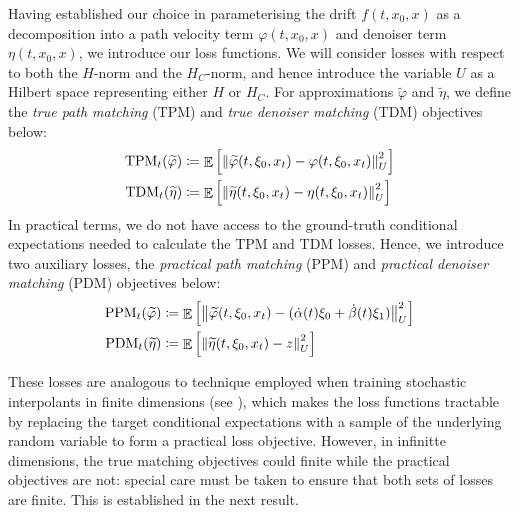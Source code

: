 Having established our choice in parameterising the drift \(f(t, x_{0}, x)\) as a decomposition into a path velocity term \(\varphi(t, x_{0}, x)\) and denoiser term \(\eta(t, x_{0}, x)\), we introduce our loss functions. We will consider losses with respect to both the \(H\)-norm and the \(H_{C}\)-norm, and hence introduce the variable \(U\) as a Hilbert space representing either \(H\) or \(H_{C}\). For approximations \(\widetilde{\varphi}\) and \(\widetilde{\eta}\), we define the \textit{true path matching} (TPM) and \textit{true denoiser matching} (TDM) objectives below:
\begin{align}
  \mathrm{TPM}_{t}(\widetilde{\varphi}) &\coloneqq \mathop{\mathbb{E}}\qty[\norm{ \widetilde{\varphi}(t, \xi_{0}, x_{t}) - \varphi(t, \xi_{0}, x_{t})}^{2}_{U}]\label{eqn:tpm} \\
  \mathrm{TDM}_{t}(\widetilde{\eta}) &\coloneqq \mathop{\mathbb{E}}\qty[\norm{ \widetilde{\eta}(t, \xi_{0}, x_{t}) - \eta(t, \xi_{0}, x_{t})}^{2}_{U}] \label{eqn:tdm}
\end{align}
In practical terms, we do not have access to the ground-truth conditional expectations needed to calculate the TPM and TDM losses. Hence, we introduce two auxiliary losses, the \textit{practical path matching} (PPM) and \textit{practical denoiser matching} (PDM) objectives below:
\begin{align}
  \mathrm{PPM}_{t}(\widetilde{\varphi}) &\coloneqq \mathop{\mathbb{E}}\qty[\norm{ \widetilde{\varphi}(t, \xi_{0}, x_{t}) - (\dot{\alpha}(t) \xi_{0} + \dot{\beta}(t) \xi_{1})}^{2}_{U}] \label{eqn:ppm}\\
  \mathrm{PDM}_{t}(\widetilde{\eta}) &\coloneqq \mathop{\mathbb{E}}\qty[\norm{ \widetilde{\eta}(t, \xi_{0}, x_{t}) - z}^{2}_{U}] \label{eqn:pdm}
\end{align}

These losses are analogous to technique employed when training stochastic interpolants in finite dimensions (see \citealp[][Theorems 2.7--2.8]{albergo2023stochasticinterpolantsunifyingframework}), which makes the loss functions tractable by replacing the target conditional expectations with a sample of the underlying random variable to form a practical loss objective. However, in infinitte dimensions, the true matching objectives could finite while the practical objectives are not: special care must be taken to ensure that both sets of losses are finite. This is established in the next result.


